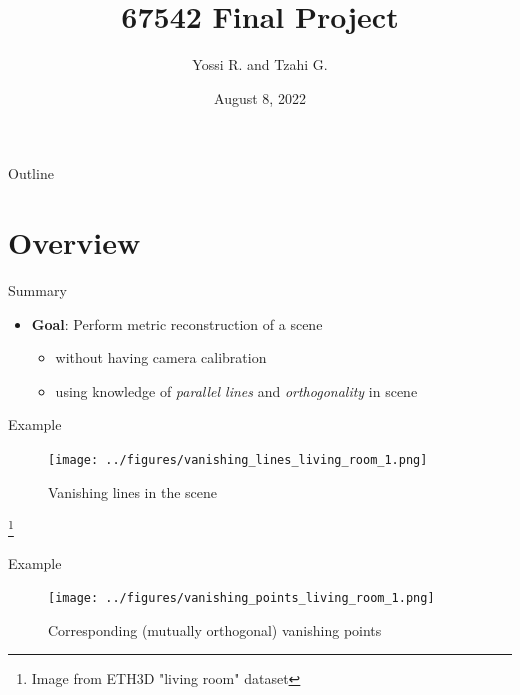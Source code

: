 \documentclass{beamer}
\title{67542 Final Project}
\author{Yossi R. and Tzahi G.}
\date{August 8, 2022}
\newcommand\blfootnote[1]{%
	\begingroup
	\renewcommand\thefootnote{}\footnote{#1}%
	\addtocounter{footnote}{-1}%
	\endgroup
}
\begin{document}

\begin{frame}
    \titlepage 
\end{frame}

\logo{}
 
\begin{frame}{Outline}
    \tableofcontents
\end{frame}

\section{Overview}

\begin{frame}{Summary}
\begin{itemize}
\item \textbf{Goal}: Perform metric reconstruction of a scene 

\begin{itemize}
	\item without having camera calibration
	\item using knowledge of  \textit{parallel lines} and \textit{orthogonality} in scene
\end{itemize}

\end{itemize}
\end{frame}

\begin{frame}{Example}
	\begin{figure}
		\centering
		\texttt{[image: ../figures/vanishing\_lines\_living\_room\_1.png]}
		\caption{Vanishing lines in the scene}
		\label{fig:Vanishing lines}
	\end{figure}

\blfootnote{Image from ETH3D "living room" dataset}
\end{frame}

\begin{frame}{Example}
	\begin{figure}
		\centering
		\texttt{[image: ../figures/vanishing\_points\_living\_room\_1.png]}
		\caption{Corresponding (mutually orthogonal) vanishing points }
		\label{fig:Vanishing points}
	\end{figure}

\end{frame}
\end{document}
